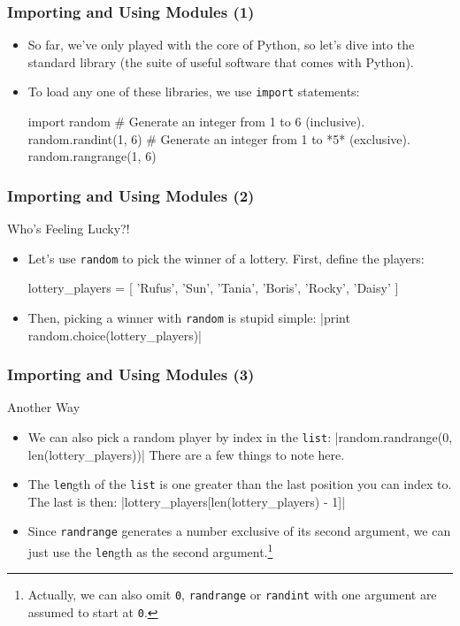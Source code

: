 \documentclass[10pt]{beamer}
\begin{document}
\begin{frame}[fragile]
  \frametitle{Importing and Using Modules (1)}
  \begin{itemize}
    \item So far, we've only played with the core of Python, so let's dive into the standard library (the suite of useful software that comes with Python).
    \item To load any one of these libraries, we use \texttt{import} statements:
      \begin{pythoncode}
  import random
  # Generate an integer from 1 to 6 (inclusive).
  random.randint(1, 6)
  # Generate an integer from 1 to *5* (exclusive).
  random.rangrange(1, 6)
      \end{pythoncode}
  \end{itemize}
\end{frame}

\begin{frame}[fragile]
  \frametitle{Importing and Using Modules (2)}
  \begin{block}{Who's Feeling Lucky?!}
    \begin{itemize}
      \item Let's use \texttt{random} to pick the winner of a lottery.
        First, define the players:
        \begin{pythoncode}
  lottery_players = [
    'Rufus', 'Sun', 'Tania',
    'Boris', 'Rocky', 'Daisy'
  ]
        \end{pythoncode}
      \item Then, picking a winner with \texttt{random} is stupid simple:
        |print random.choice(lottery_players)|
    \end{itemize}
  \end{block}
\end{frame}

\begin{frame}[fragile]
  \frametitle{Importing and Using Modules (3)}
  \begin{block}{Another Way}
    \begin{itemize}
      \item We can also pick a random player by index in the \texttt{list}:
      |random.randrange(0, len(lottery_players))|
      There are a few things to note here.
      \item The \texttt{len}gth of the \texttt{list} is one greater than the last position you can index to.
      The last is then:
        |lottery_players[len(lottery_players) - 1]|
      \item Since \texttt{randrange} generates a number exclusive of its second argument, we can just use the \texttt{len}gth as the second argument.\footnote{Actually, we can also omit \texttt{0}, \texttt{randrange} or \texttt{randint} with one argument are assumed to start at \texttt{0}.}
    \end{itemize}
  \end{block}
\end{frame}
\end{document}
